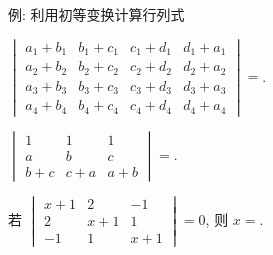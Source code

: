 \begin{frame}{例: 利用初等变换计算行列式}\small
	\onslide<+->
	\begin{exercise}
		$\begin{vmatrix}
			a_1+b_1&b_1+c_1&c_1+d_1&d_1+a_1\\
			a_2+b_2&b_2+c_2&c_2+d_2&d_2+a_2\\
			a_3+b_3&b_3+c_3&c_3+d_3&d_3+a_3\\
			a_4+b_4&b_4+c_4&c_4+d_4&d_4+a_4
		\end{vmatrix}=$.
	\end{exercise}
	\onslide<+->
	\begin{exercise}
		$\begin{vmatrix}
			1&1&1\\
			a&b&c\\
			b+c&c+a&a+b
		\end{vmatrix}=$\fillblank{\visible<+->{$0$}}.
	\end{exercise}
	\onslide<+->
	\begin{exercise}
		若 $\begin{vmatrix}
			x+1&2&-1\\
			2&x+1&1\\
			-1&1&x+1
		\end{vmatrix}=0$, 则 $x=$\fillblank[3cm]{\visible<+->{$-3,\pm\sqrt3$}}.
	\end{exercise}
\end{frame}


